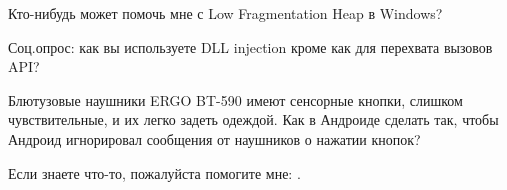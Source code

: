\myhrule{}

Кто-нибудь может помочь мне с Low Fragmentation Heap в Windows?

\myhrule{}

Соц.опрос: как вы используете DLL injection кроме как для перехвата вызовов API?

\myhrule{}

Блютузовые наушники ERGO BT-590 имеют сенсорные кнопки, слишком чувствительные, и их легко задеть одеждой.
Как в Андроиде сделать так, чтобы Андроид игнорировал сообщения от наушников о нажатии кнопок?

\myhrule{}

Если знаете что-то, пожалуйста помогите мне: \EMAILS{}.

